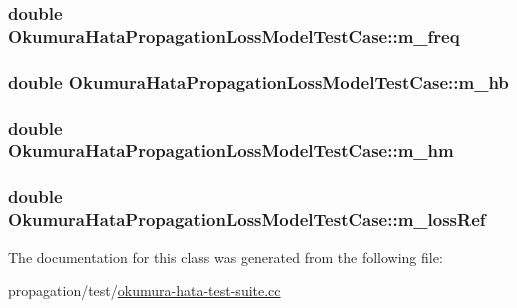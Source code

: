 \subsubsection[{\texorpdfstring{m\+\_\+freq}{m_freq}}]{\setlength{\rightskip}{0pt plus 5cm}double Okumura\+Hata\+Propagation\+Loss\+Model\+Test\+Case\+::m\+\_\+freq\hspace{0.3cm}{\ttfamily [private]}}\hypertarget{classOkumuraHataPropagationLossModelTestCase_a97db57ea899783a498067a625648bdd3}{}\label{classOkumuraHataPropagationLossModelTestCase_a97db57ea899783a498067a625648bdd3}
\subsubsection[{\texorpdfstring{m\+\_\+hb}{m_hb}}]{\setlength{\rightskip}{0pt plus 5cm}double Okumura\+Hata\+Propagation\+Loss\+Model\+Test\+Case\+::m\+\_\+hb\hspace{0.3cm}{\ttfamily [private]}}\hypertarget{classOkumuraHataPropagationLossModelTestCase_aabbbba0a92cb1bf56f2885a0f9e6507f}{}\label{classOkumuraHataPropagationLossModelTestCase_aabbbba0a92cb1bf56f2885a0f9e6507f}
\subsubsection[{\texorpdfstring{m\+\_\+hm}{m_hm}}]{\setlength{\rightskip}{0pt plus 5cm}double Okumura\+Hata\+Propagation\+Loss\+Model\+Test\+Case\+::m\+\_\+hm\hspace{0.3cm}{\ttfamily [private]}}\hypertarget{classOkumuraHataPropagationLossModelTestCase_a508282b91e977722ba50d754c8b8a4c4}{}\label{classOkumuraHataPropagationLossModelTestCase_a508282b91e977722ba50d754c8b8a4c4}
\subsubsection[{\texorpdfstring{m\+\_\+loss\+Ref}{m_lossRef}}]{\setlength{\rightskip}{0pt plus 5cm}double Okumura\+Hata\+Propagation\+Loss\+Model\+Test\+Case\+::m\+\_\+loss\+Ref\hspace{0.3cm}{\ttfamily [private]}}\hypertarget{classOkumuraHataPropagationLossModelTestCase_aea0cef35a82088eea67d0f39fa517091}{}\label{classOkumuraHataPropagationLossModelTestCase_aea0cef35a82088eea67d0f39fa517091}


The documentation for this class was generated from the following file\+:\begin{DoxyCompactItemize}
\item 
propagation/test/\hyperlink{okumura-hata-test-suite_8cc}{okumura-\/hata-\/test-\/suite.\+cc}\end{DoxyCompactItemize}

